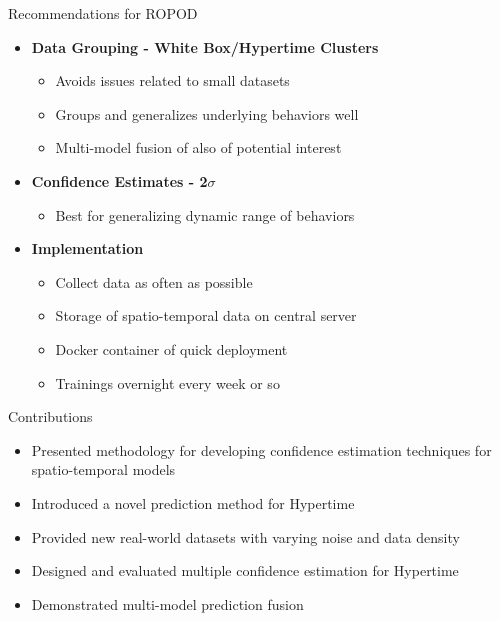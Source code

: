 \documentclass{beamer}
\begin{document}
\begin{frame}[t]{Recommendations for ROPOD}

  \begin{itemize}
  \setlength\itemsep{1.00em}
    \item \textbf{Data Grouping - White Box/Hypertime Clusters}
      \begin{itemize}
        \item Avoids issues related to small datasets
        \item Groups and generalizes underlying behaviors well
        \item Multi-model fusion of also of potential interest
      \end{itemize}

    \item \textbf{Confidence Estimates - 2$\sigma$}
      \begin{itemize}
        \item Best for generalizing dynamic range of behaviors
      \end{itemize}

    \item \textbf{Implementation}
      \begin{itemize}
        \item Collect data as often as possible
        \item Storage of spatio-temporal data on central server
        \item Docker container of quick deployment
        \item Trainings overnight every week or so
      \end{itemize}

  \end{itemize}

\end{frame}


\begin{frame}[t]{Contributions}

  \begin{itemize}
    \setlength\itemsep{1em}
        \item Presented methodology for developing confidence estimation techniques for spatio-temporal models

        \item Introduced a novel prediction method for Hypertime

        \item Provided new real-world datasets with varying noise and data density

        \item Designed and evaluated multiple confidence estimation for Hypertime

        \item Demonstrated multi-model prediction fusion

  \end{itemize}

\end{frame}
\end{document}
